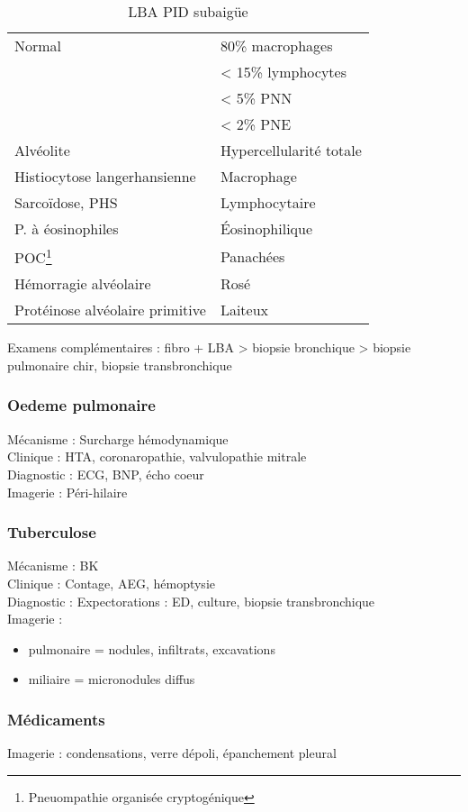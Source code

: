 \documentclass{article}
\begin{document}
\begin{table}[htbp]
\caption{LBA PID subaigüe}
\centering
\begin{tabular}{ll}
\toprule
Normal & 80\% macrophages\\
 & < 15\% lymphocytes\\
 & < 5\% PNN\\
 & < 2\% PNE\\
\midrule
Alvéolite & Hypercellularité totale\\
Histiocytose langerhansienne & Macrophage\\
Sarcoïdose, PHS & Lymphocytaire\\
P. à éosinophiles & Éosinophilique\\
POC\footnote{Pneuompathie organisée cryptogénique} & Panachées\\
Hémorragie alvéolaire & Rosé\\
Protéinose alvéolaire primitive & Laiteux\\
\bottomrule
\end{tabular}
\end{table}

Examens complémentaires : fibro + LBA > biopsie bronchique > biopsie pulmonaire chir, biopsie transbronchique

\subsubsection{Oedeme pulmonaire}
Mécanisme : Surcharge hémodynamique\\
Clinique : HTA, coronaropathie, valvulopathie mitrale\\
Diagnostic : ECG, BNP, écho coeur\\
Imagerie : Péri-hilaire

\subsubsection{Tuberculose}
Mécanisme : BK\\
Clinique : Contage, AEG, hémoptysie\\
Diagnostic : Expectorations : ED, culture, biopsie transbronchique\\
Imagerie : 
\begin{itemize}
\item pulmonaire = nodules, infiltrats, excavations
\item miliaire = micronodules diffus
\end{itemize}

\subsubsection{Médicaments}
Imagerie : condensations, verre dépoli, épanchement pleural
\end{document}
